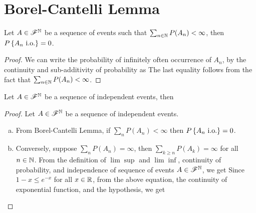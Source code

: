 \documentclass[letterpaper,10pt,english]{article}
\begin{document}
\section{Borel-Cantelli Lemma}
\begin{prop} 
Let $A \in \mathscr{F}^{\mathbb{N}}$ be a sequence of events such that $\sum_{n \in \mathbb{N}}P(A_n) < \infty$, 
then $P\left\{A_n \text{ i.o.}\right\} = 0$. 
\end{prop}
\begin{proof} 
We can write the probability of infinitely often occurrence of $A_n$, by the continuity and sub-additivity of probability as  
The last equality follows from the fact that $\sum_{n \in \mathbb{N}}P(A_n) < \infty$. 
\end{proof}
\begin{prop}
Let $A \in \mathscr{F}^{\mathbb{N}}$ be a sequence of independent events, then
\end{prop}
\begin{proof} 
Let $A \in \mathscr{F}^{\mathbb{N}}$ be a sequence of independent events. 
\begin{enumerate}[(a)]
\item From Borel-Cantelli Lemma, if $\sum_nP(A_n) < \infty$ then $P\left\{A_n\text{ i.o.}\right\} = 0$. 
\item Conversely, suppose $\sum_nP(A_n) = \infty$, 
then $\sum_{k \ge n}P(A_k) = \infty$ for all $n \in \mathbb{N}$.  
From the definition of $\lim\sup$ and $\lim\inf$, continuity of probability, 
and independence of sequence of events $A \in \mathscr{F}^{\mathbb{N}}$, we get  
Since $1-x \le e^{-x}$ for all $x \in \mathbb{R}$, from the above equation, the continuity of exponential function, and the hypothesis, we get 
\end{enumerate}
\end{proof}
\end{document}
